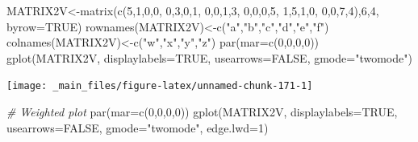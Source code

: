 \documentclass[
  notitlepage,
  onecolumn,
  openany]{book}
\newenvironment{Shaded}{\begin{snugshade}}{\end{snugshade}}
\newcommand{\AttributeTok}[1]{\textcolor[rgb]{0.77,0.63,0.00}{#1}}
\newcommand{\CommentTok}[1]{\textcolor[rgb]{0.56,0.35,0.01}{\textit{#1}}}
\newcommand{\ConstantTok}[1]{\textcolor[rgb]{0.00,0.00,0.00}{#1}}
\newcommand{\DecValTok}[1]{\textcolor[rgb]{0.00,0.00,0.81}{#1}}
\newcommand{\FunctionTok}[1]{\textcolor[rgb]{0.00,0.00,0.00}{#1}}
\newcommand{\NormalTok}[1]{#1}
\newcommand{\OtherTok}[1]{\textcolor[rgb]{0.56,0.35,0.01}{#1}}
\newcommand{\StringTok}[1]{\textcolor[rgb]{0.31,0.60,0.02}{#1}}
\begin{document}
\begin{Shaded}
\begin{Highlighting}[]
\NormalTok{MATRIX2V}\OtherTok{\textless{}{-}}\FunctionTok{matrix}\NormalTok{(}\FunctionTok{c}\NormalTok{(}\DecValTok{5}\NormalTok{,}\DecValTok{1}\NormalTok{,}\DecValTok{0}\NormalTok{,}\DecValTok{0}\NormalTok{,}
                   \DecValTok{0}\NormalTok{,}\DecValTok{3}\NormalTok{,}\DecValTok{0}\NormalTok{,}\DecValTok{1}\NormalTok{,}
                   \DecValTok{0}\NormalTok{,}\DecValTok{0}\NormalTok{,}\DecValTok{1}\NormalTok{,}\DecValTok{3}\NormalTok{,}
                   \DecValTok{0}\NormalTok{,}\DecValTok{0}\NormalTok{,}\DecValTok{0}\NormalTok{,}\DecValTok{5}\NormalTok{,}
                   \DecValTok{1}\NormalTok{,}\DecValTok{5}\NormalTok{,}\DecValTok{1}\NormalTok{,}\DecValTok{0}\NormalTok{,}
                   \DecValTok{0}\NormalTok{,}\DecValTok{0}\NormalTok{,}\DecValTok{7}\NormalTok{,}\DecValTok{4}\NormalTok{),}\DecValTok{6}\NormalTok{,}\DecValTok{4}\NormalTok{, }\AttributeTok{byrow=}\ConstantTok{TRUE}\NormalTok{)}
\FunctionTok{rownames}\NormalTok{(MATRIX2V)}\OtherTok{\textless{}{-}}\FunctionTok{c}\NormalTok{(}\StringTok{"a"}\NormalTok{,}\StringTok{"b"}\NormalTok{,}\StringTok{"c"}\NormalTok{,}\StringTok{"d"}\NormalTok{,}\StringTok{"e"}\NormalTok{,}\StringTok{"f"}\NormalTok{)}
\FunctionTok{colnames}\NormalTok{(MATRIX2V)}\OtherTok{\textless{}{-}}\FunctionTok{c}\NormalTok{(}\StringTok{"w"}\NormalTok{,}\StringTok{"x"}\NormalTok{,}\StringTok{"y"}\NormalTok{,}\StringTok{"z"}\NormalTok{)}
\FunctionTok{par}\NormalTok{(}\AttributeTok{mar=}\FunctionTok{c}\NormalTok{(}\DecValTok{0}\NormalTok{,}\DecValTok{0}\NormalTok{,}\DecValTok{0}\NormalTok{,}\DecValTok{0}\NormalTok{))}
\FunctionTok{gplot}\NormalTok{(MATRIX2V, }\AttributeTok{displaylabels=}\ConstantTok{TRUE}\NormalTok{, }
      \AttributeTok{usearrows=}\ConstantTok{FALSE}\NormalTok{, }\AttributeTok{gmode=}\StringTok{"twomode"}\NormalTok{)}
\end{Highlighting}
\end{Shaded}

\texttt{[image: \_main\_files/figure-latex/unnamed-chunk-171-1]}

\begin{Shaded}
\begin{Highlighting}[]
\CommentTok{\# Weighted plot}
\FunctionTok{par}\NormalTok{(}\AttributeTok{mar=}\FunctionTok{c}\NormalTok{(}\DecValTok{0}\NormalTok{,}\DecValTok{0}\NormalTok{,}\DecValTok{0}\NormalTok{,}\DecValTok{0}\NormalTok{))}
\FunctionTok{gplot}\NormalTok{(MATRIX2V, }\AttributeTok{displaylabels=}\ConstantTok{TRUE}\NormalTok{, }
      \AttributeTok{usearrows=}\ConstantTok{FALSE}\NormalTok{, }
      \AttributeTok{gmode=}\StringTok{"twomode"}\NormalTok{,}
      \AttributeTok{edge.lwd=}\DecValTok{1}\NormalTok{)}
\end{Highlighting}
\end{Shaded}
\end{document}
